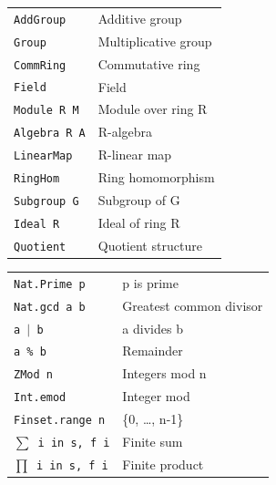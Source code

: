 \documentclass[10pt]{extarticle}
\begin{document}
\newpage


\begin{multicols}{2}

\begin{tabularx}{\linewidth}{@{}l@{\enspace}Y@{}}
\texttt{AddGroup}             & Additive group \\
\texttt{Group}                & Multiplicative group \\
\texttt{CommRing}             & Commutative ring \\
\texttt{Field}                & Field \\
\texttt{Module R M}           & Module over ring R \\
\texttt{Algebra R A}          & R-algebra \\
\texttt{LinearMap}            & R-linear map \\
\texttt{RingHom}              & Ring homomorphism \\
\texttt{Subgroup G}           & Subgroup of G \\
\texttt{Ideal R}              & Ideal of ring R \\
\texttt{Quotient}             & Quotient structure \\
\end{tabularx}

\begin{tabularx}{\linewidth}{@{}l@{\enspace}Y@{}}
\texttt{Nat.Prime p}                 & p is prime \\
\texttt{Nat.gcd a b}                 & Greatest common divisor \\
\texttt{a $\mid$ b}                  & a divides b \\
\texttt{a \% b}                      & Remainder \\
\texttt{ZMod n}                      & Integers mod n \\
\texttt{Int.emod}                    & Integer mod \\
\texttt{Finset.range n}              & \{0, \ldots, n-1\} \\
\texttt{$\sum$ i in s, f i}         & Finite sum \\
\texttt{$\prod$ i in s, f i}        & Finite product \\
\end{tabularx}


\end{multicols}
\end{document}
